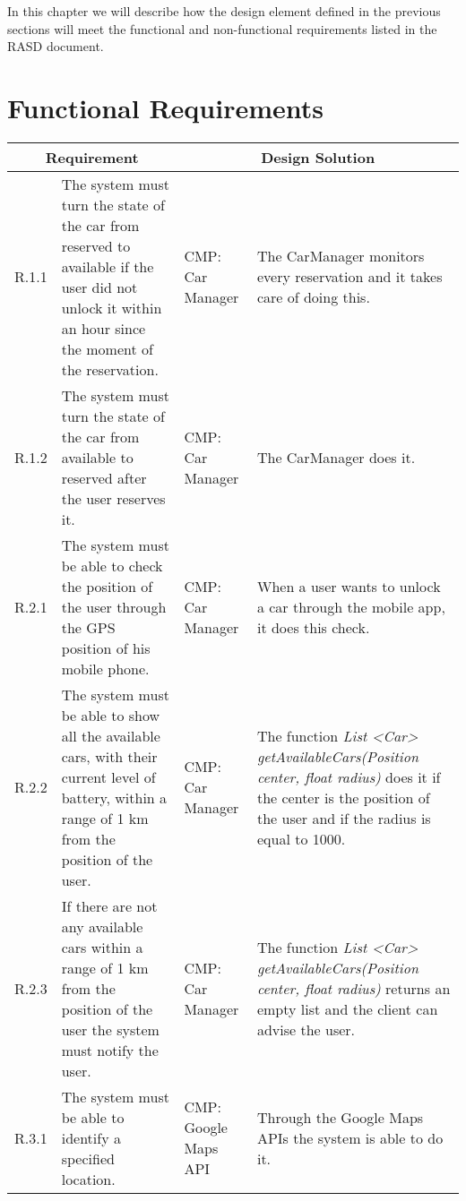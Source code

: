 In this chapter we will describe how the design element defined in the previous sections will meet the functional and non-functional requirements listed in the RASD document.

\section{Functional Requirements}

\begin{center}
\begin{longtable}{|p{}|p{}|>{\raggedright\arraybackslash}p{}|>{\raggedright\arraybackslash}p{}|}
\hline
\multicolumn{2}{|c|}{\textbf{Requirement}} & \multicolumn{2}{c|}{\textbf{Design Solution}} \\ \hline
R.1.1 & The system must turn the state of the car from reserved to available if the user did not unlock it within an hour since the moment of the reservation. & CMP: \linebreak Car Manager & The CarManager monitors every reservation and it takes care of doing this.  \\ \hline
R.1.2 & The system must turn the state of the car from available to reserved after the user reserves it. & CMP: Car Manager & The CarManager does it. \\ \hline
R.2.1 & The system must be able to check the position of the user through the GPS position of his mobile phone. & CMP: Car Manager & When a user wants to unlock a car through the mobile app, it does this check. \\ \hline
R.2.2 & The system must be able to show all the available cars, with their current level of battery, within a range of 1 km from the position of the user. & CMP: Car Manager & The function \textit{List \textless Car\textgreater{} getAvailableCars(Position center, float radius)} does it if the center is the position of the user and if the radius is equal to 1000. \\ \hline
R.2.3 & If there are not any available cars within a range of 1 km from the position of the user the system must notify the user. & CMP: Car Manager & The function \textit{List \textless Car\textgreater{} getAvailableCars(Position center, float radius)} returns an empty list and the client can advise the user. \\ \hline
R.3.1 & The system must be able to identify a specified location. & CMP: Google Maps API & Through the Google Maps APIs the system is able to do it. \\ \hline

\end{longtable}
\end{center}
